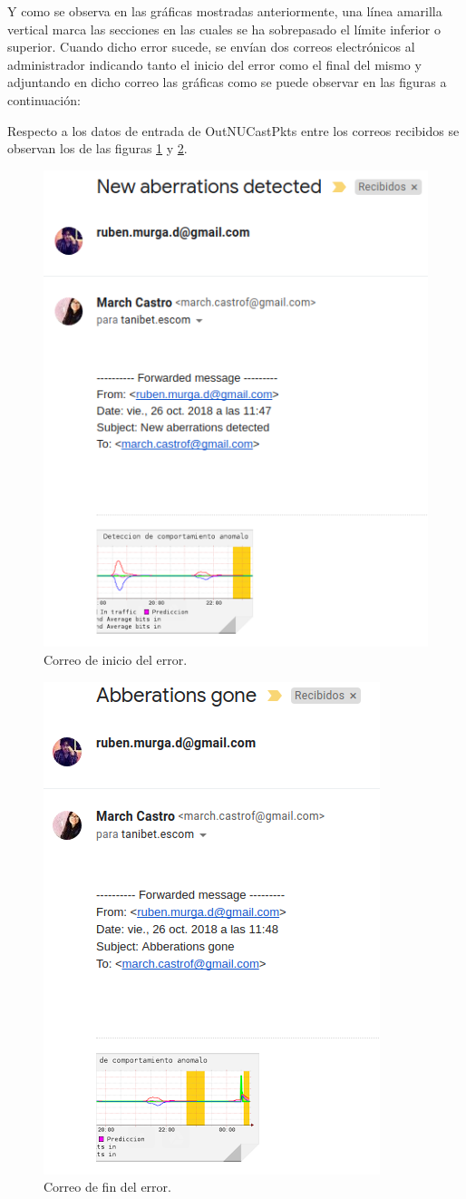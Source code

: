 Y como se observa en las gráficas mostradas anteriormente, una línea amarilla vertical marca las secciones en las cuales se ha sobrepasado el límite inferior o superior. Cuando dicho error sucede, se envían dos correos electrónicos al administrador indicando tanto el inicio del error como el final del mismo y adjuntando en dicho correo las gráficas como se puede observar en las figuras a continuación:
\\ \par
Respecto a los datos de entrada de OutNUCastPkts entre los correos recibidos se observan los de las figuras \ref{image:inicio} y \ref{image:fin}.
\FloatBarrier
\begin{figure}[htbp!]
		\centering
			\includegraphics[width=.6 \textwidth]{images/inicio}
		\caption{Correo de inicio del error.}
		\label{image:inicio}
\end{figure}
\FloatBarrier
\FloatBarrier
\begin{figure}[htbp!]
		\centering
			\includegraphics[width=.5 \textwidth]{images/fin}
		\caption{Correo de fin del error.}
		\label{image:fin}
\end{figure}
